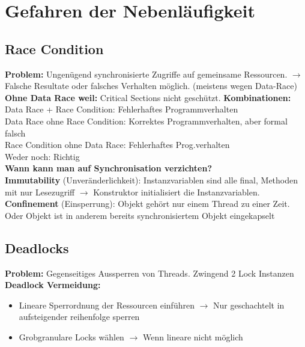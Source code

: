 
\section{Gefahren der Nebenläufigkeit}
\subsection{Race Condition}
\textcolor{b}{\textbf{Problem:}} Ungenügend synchronisierte Zugriffe auf gemeinsame Ressourcen. $\rightarrow$ Falsche Resultate oder falsches Verhalten möglich. (meistens wegen Data-Race)\\
\textbf{Ohne Data Race weil:} Critical Sections nicht geschützt.
\textbf{Kombinationen:}\\
\textcolor{b}{Data Race + Race Condition:} Fehlerhaftes Programmverhalten\\
\textcolor{b}{Data Race ohne Race Condition:} Korrektes Programmverhalten, aber formal falsch\\
\textcolor{b}{Race Condition ohne Data Race:} Fehlerhaftes Prog.verhalten\\
\textcolor{b}{Weder noch:} Richtig\\
\textcolor{b}{\textbf{Wann kann man auf Synchronisation verzichten?}}\\
\textbf{Immutability} (Unveränderlichkeit): Instanzvariablen sind alle \textcolor{b}{final}, Methoden mit nur Lesezugriff $\rightarrow$ Konstruktor initialisiert die Instanzvariablen.\\
\textbf{Confinement} (Einsperrung): Objekt gehört nur einem Thread zu einer Zeit. Oder Objekt ist in anderem bereits synchronisiertem Objekt eingekapselt
\subsection{Deadlocks}
\textcolor{b}{\textbf{Problem:}} Gegenseitiges Aussperren von Threads. Zwingend 2 Lock Instanzen\\
\textcolor{b}{\textbf{Deadlock Vermeidung:}}
\begin{itemize}[topsep=0pt, leftmargin=3mm]
    \setlength\itemsep{-0.3em}
    \item Lineare Sperrordnung der Ressourcen einführen $\rightarrow$ Nur geschachtelt in aufsteigender reihenfolge sperren
    \item Grobgranulare Locks wählen $\rightarrow$ Wenn lineare nicht möglich
\end{itemize}
